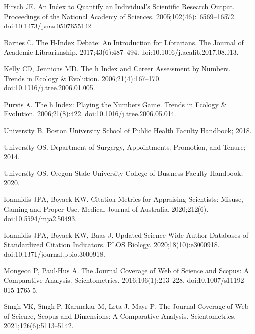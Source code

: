 \documentclass[
  10pt,
  letterpaper,
]{article}
\begin{document}
\begin{thebibliography}{10}
Hirsch JE.
\newblock An Index to Quantify an Individual's Scientific Research Output.
\newblock Proceedings of the National Academy of Sciences. 2005;102(46):16569--16572.
\newblock doi:{10.1073/pnas.0507655102}.

Barnes C.
\newblock The H-Index {{Debate}}: {{An Introduction}} for {{Librarians}}.
\newblock The Journal of Academic Librarianship. 2017;43(6):487--494.
\newblock doi:{10.1016/j.acalib.2017.08.013}.

Kelly CD, Jennions MD.
\newblock The h Index and Career Assessment by Numbers.
\newblock Trends in Ecology \& Evolution. 2006;21(4):167--170.
\newblock doi:{10.1016/j.tree.2006.01.005}.

Purvis A.
\newblock The h Index: Playing the Numbers Game.
\newblock Trends in Ecology \& Evolution. 2006;21(8):422.
\newblock doi:{10.1016/j.tree.2006.05.014}.

University B.
\newblock Boston {{University School}} of {{Public Health Faculty Handbook}}; 2018.

University OS.
\newblock Department of {{Surgergy}}, {{Appointments}}, {{Promotion}}, and {{Tenure}}; 2014.

University OS.
\newblock Oregon {{State University College}} of {{Business Faculty Handbook}}; 2020.

Ioannidis JPA, Boyack KW.
\newblock Citation Metrics for Appraising Scientists: Misuse, Gaming and Proper Use.
\newblock Medical Journal of Australia. 2020;212(6).
\newblock doi:{10.5694/mja2.50493}.

Ioannidis JPA, Boyack KW, Baas J.
\newblock Updated Science-Wide Author Databases of Standardized Citation Indicators.
\newblock PLOS Biology. 2020;18(10):e3000918.
\newblock doi:{10.1371/journal.pbio.3000918}.

Mongeon P, {Paul-Hus} A.
\newblock The Journal Coverage of {{Web}} of {{Science}} and {{Scopus}}: A Comparative Analysis.
\newblock Scientometrics. 2016;106(1):213--228.
\newblock doi:{10.1007/s11192-015-1765-5}.

Singh VK, Singh P, Karmakar M, Leta J, Mayr P.
\newblock The Journal Coverage of {{Web}} of {{Science}}, {{Scopus}} and {{Dimensions}}: {{A}} Comparative Analysis.
\newblock Scientometrics. 2021;126(6):5113--5142.


\end{thebibliography}
\end{document}

